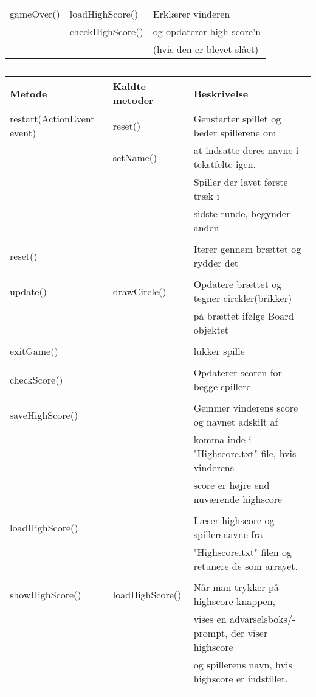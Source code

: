 \begin{table}[H]
\begin{tabular}{lll}
gameOver() & loadHighScore() & Erklærer vinderen\\
& checkHighScore() & og opdaterer high-score'n\\
&& (hvis den er blevet slået) \\


\bottomrule
\end{tabular}
\end{table}

\begin{table}[H]
\centering
\caption{}\label{tbl:2}
\begin{tabular}{lll}
\toprule
Metode & Kaldte metoder & Beskrivelse  \\
\midrule
restart(ActionEvent event) & reset() & Genstarter spillet og beder spillerene om   \\
& setName() & at indsatte deres navne  i tekstfelte igen.  \\
& & Spiller der lavet første træk i  \\
& & sidste runde, begynder anden \\
\\
reset() & & Iterer gennem brættet og rydder det \\
\\
update() & drawCircle() & Opdatere brættet og tegner circkler(brikker)  \\
& & på brættet ifølge Board objektet \\
\\
exitGame() & & lukker spille\\
\\
checkScore()& & Opdaterer scoren for begge spillere\\
\\

saveHighScore() & & Gemmer vinderens score og navnet adskilt af \\
& &  komma inde i "Highscore.txt" file, hvis vinderens  \\
& & score er højre end nuværende highscore\\
\\
loadHighScore() & & Læser highscore og spillersnavne fra \\
& & "Highscore.txt" filen og retunere de som arrayet.\\
\\
showHighScore() & loadHighScore() & Når man trykker på highscore-knappen, \\
& & vises en advarselsboks/-prompt, der viser highscore  \\
& & og spillerens navn, hvis highscore er indstillet. \\
\\


\end{tabular}
\end{table}
